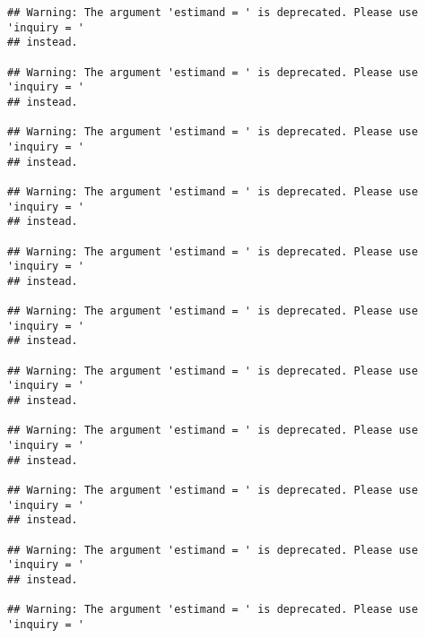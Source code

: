 \documentclass[
]{book}
\begin{document}
\begin{verbatim}
## Warning: The argument 'estimand = ' is deprecated. Please use 'inquiry = '
## instead.

## Warning: The argument 'estimand = ' is deprecated. Please use 'inquiry = '
## instead.

## Warning: The argument 'estimand = ' is deprecated. Please use 'inquiry = '
## instead.

## Warning: The argument 'estimand = ' is deprecated. Please use 'inquiry = '
## instead.

## Warning: The argument 'estimand = ' is deprecated. Please use 'inquiry = '
## instead.

## Warning: The argument 'estimand = ' is deprecated. Please use 'inquiry = '
## instead.

## Warning: The argument 'estimand = ' is deprecated. Please use 'inquiry = '
## instead.

## Warning: The argument 'estimand = ' is deprecated. Please use 'inquiry = '
## instead.

## Warning: The argument 'estimand = ' is deprecated. Please use 'inquiry = '
## instead.

## Warning: The argument 'estimand = ' is deprecated. Please use 'inquiry = '
## instead.

## Warning: The argument 'estimand = ' is deprecated. Please use 'inquiry = '
## instead.

## Warning: The argument 'estimand = ' is deprecated. Please use 'inquiry = '
## instead.

## Warning: The argument 'estimand = ' is deprecated. Please use 'inquiry = '
## instead.

## Warning: The argument 'estimand = ' is deprecated. Please use 'inquiry = '
## instead.

## Warning: The argument 'estimand = ' is deprecated. Please use 'inquiry = '
## instead.

## Warning: The argument 'estimand = ' is deprecated. Please use 'inquiry = '
## instead.

## Warning: The argument 'estimand = ' is deprecated. Please use 'inquiry = '
## instead.

## Warning: The argument 'estimand = ' is deprecated. Please use 'inquiry = '
## instead.

## Warning: The argument 'estimand = ' is deprecated. Please use 'inquiry = '
## instead.

## Warning: The argument 'estimand = ' is deprecated. Please use 'inquiry = '
## instead.


\end{verbatim}
\end{document}
